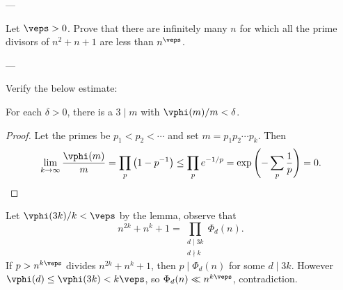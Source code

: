 
---

Let $\veps>0$. Prove that there are infinitely many $n$ for which all the prime divisors of $n^2+n+1$ are less than $n^\veps$.

---

Verify the below estimate:
\begin{lemma*}
    For each $\delta>0$, there is a $3\mid m$ with $\vphi(m)/m<\delta$.
\end{lemma*}
\begin{proof}
    Let the primes be $p_1<p_2<\cdots$ and set $m=p_1p_2\cdots p_k$. Then
    \[\lim_{k\to\infty}\frac{\vphi(m)}m=\prod_p\left(1-p^{-1}\right)\le\prod_pe^{-1/p}=\exp\left(-\sum_p\frac1p\right)=0.\]
\end{proof}

Let $\vphi(3k)/k<\veps$ by the lemma, observe that
\[n^{2k}+n^k+1=\prod_{\substack{d\mid 3k\\ d\nmid k}}\Phi_d(n).\]
If $p>n^{k\veps}$ divides $n^{2k}+n^k+1$, then $p\mid\Phi_d(n)$ for some $d\mid3k$. However $\vphi(d)\le\vphi(3k)<k\veps$, so $\Phi_d(n)\ll n^{k\veps}$, contradiction.
